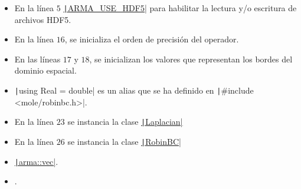\begin{problem}
\begin{itemize}
      \item

            En la línea $5$
            \href{https://arma.sourceforge.net/docs.html#config_hpp}{\texttt|ARMA_USE_HDF5|}
            para habilitar la lectura y/o escritura de archivos HDF5.

      \item

            En la línea $16$, se inicializa el orden de precisión del
            operador.

      \item

            En las líneas $17$ y $18$, se inicializan los valores que
            representan los bordes del dominio espacial.

      \item

            \texttt|using Real = double| es un alias que se ha
            definido en \texttt|#include <mole/robinbc.h>|.

      \item

            En la línea $23$ se instancia la clase
            \href{https://carlosal1015.github.io/mole_examples/api_docs/cpp/html/classLaplacian.html}{\texttt|Laplacian|}

      \item

            En la línea $26$ se instancia la clase
            \href{https://carlosal1015.github.io/mole_examples/api_docs/cpp/html/classRobinBC.html}{\texttt|RobinBC|}

      \item

            \href{https://arma.sourceforge.net/docs.html#Col}{\texttt|arma::vec|}.

      \item

            .
\end{itemize}
\noQED %
\end{problem}